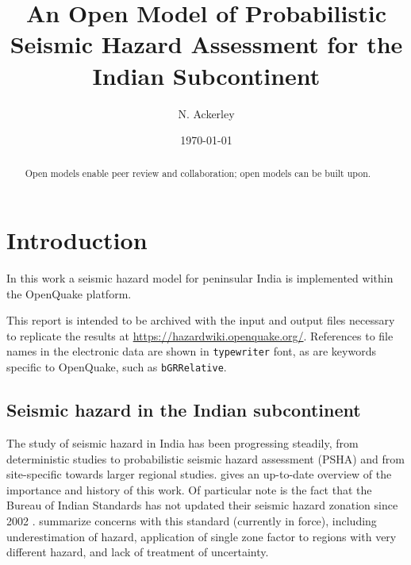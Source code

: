 \documentclass{article}
\begin{document}
\title{An Open Model of Probabilistic Seismic Hazard Assessment for the Indian Subcontinent}
\date{\today}

\setcounter{Maxaffil}{0} %
\author[1,2]{N. Ackerley}

\maketitle

\begin{abstract}
Open models enable peer review and collaboration; open models can be built upon.
\end{abstract}

\tableofcontents
\listoffigures
\listoftables

\section{Introduction}
\label{sec:Introduction}

In this work a seismic hazard model for peninsular India \cite{nath2012probabilistic} is implemented within the OpenQuake \citep{pagani2014openquake,crowley2015openquake} platform.

This report is intended to be archived with the input and output files necessary to replicate the results at \url{https://hazardwiki.openquake.org/}.
References to file names in the electronic data are shown in \texttt{typewriter} font, as are keywords specific to OpenQuake, such as \texttt{bGRRelative}.

\subsection{Seismic hazard in the Indian subcontinent}
\label{subsec:PshaIndia}

The study of seismic hazard in India has been progressing steadily, from deterministic studies \citep{bis2002criteria} to probabilistic seismic hazard assessment (PSHA) and from site-specific towards larger regional studies.
\cite{ashish2016probabilistic} gives an up-to-date overview of the importance and history of this work.
Of particular note is the fact that the Bureau of Indian Standards has not updated their seismic hazard zonation since 2002 \citep{bis2002criteria}.
\cite{nath2012probabilistic} summarize concerns with this standard (currently in force), including underestimation of hazard, application of single zone factor to regions with very different hazard, and lack of treatment of uncertainty.
\end{document}
